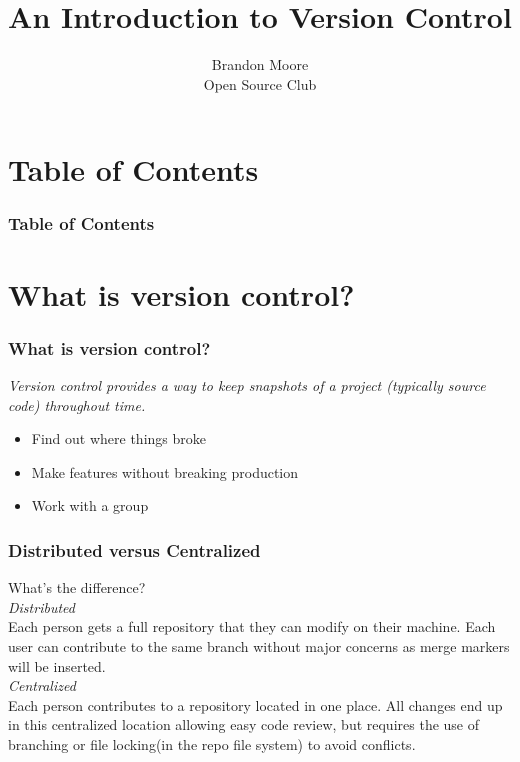 \documentclass[8pt]{beamer}
\title{An Introduction to Version Control}
\author{Brandon Moore\\Open Source Club}
\begin{document}
\begin{frame}
	\titlepage
\end{frame}

\section{Table of Contents}
\begin{frame}
	\frametitle{Table of Contents}
	\tableofcontents[]
\end{frame}

\section{What is version control?}
\begin{frame}
	\frametitle{What is version control?}
	\textit{Version control provides a way to keep snapshots of a project (typically source code) throughout time.}\\
	\hfill \break
	\onslide<2->{\textbf{Why?}}
	\begin{itemize}
		\item<3-> Find out where things broke
		\item<4-> Make features without breaking production
		\item<5-> Work with a group
	\end{itemize}
\end{frame}

\begin{frame}
	\frametitle{Distributed versus Centralized}
	What's the difference?\\
	\hfill \break
	\textit{Distributed}\\
	Each person gets a full repository that they can modify on their machine. Each user can contribute to the same branch without major concerns as merge markers will be inserted.\\
	\hfill \break
	\textit{Centralized}\\
	Each person contributes to a repository located in one place. All changes end up in this centralized location allowing easy code review, but requires the use of branching or file locking(in the repo file system) to avoid conflicts.\\
\end{frame}
\end{document}
